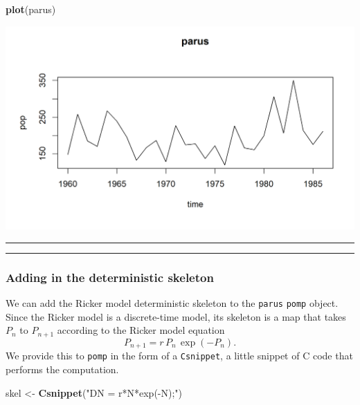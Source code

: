 \documentclass[]{article}
\newenvironment{Shaded}{\begin{snugshade}}{\end{snugshade}}
\newcommand{\KeywordTok}[1]{\textcolor[rgb]{0.13,0.29,0.53}{\textbf{#1}}}
\newcommand{\StringTok}[1]{\textcolor[rgb]{0.31,0.60,0.02}{#1}}
\newcommand{\NormalTok}[1]{#1}
\begin{document}
\begin{Shaded}
\begin{Highlighting}[]
\KeywordTok{plot}\NormalTok{(parus)}
\end{Highlighting}
\end{Shaded}

\begin{center}\includegraphics{figure/intro-parus-plot1-1} \end{center}

\begin{center}\rule{0.5\linewidth}{\linethickness}\end{center}

\begin{center}\rule{0.5\linewidth}{\linethickness}\end{center}

\subsubsection{Adding in the deterministic
skeleton}\label{adding-in-the-deterministic-skeleton}

We can add the Ricker model deterministic skeleton to the \texttt{parus}
\texttt{pomp} object. Since the Ricker model is a discrete-time model,
its skeleton is a map that takes \(P_n\) to \(P_{n+1}\) according to the
Ricker model equation \[
P_{n+1} = r\,P_{n}\,\exp(-P_{n}).
\] We provide this to \texttt{pomp} in the form of a \texttt{Csnippet},
a little snippet of C code that performs the computation.

\begin{Shaded}
\begin{Highlighting}[]
\NormalTok{skel <-}\StringTok{ }\KeywordTok{Csnippet}\NormalTok{(}\StringTok{"DN = r*N*exp(-N);"}\NormalTok{)}
\end{Highlighting}
\end{Shaded}
\end{document}
